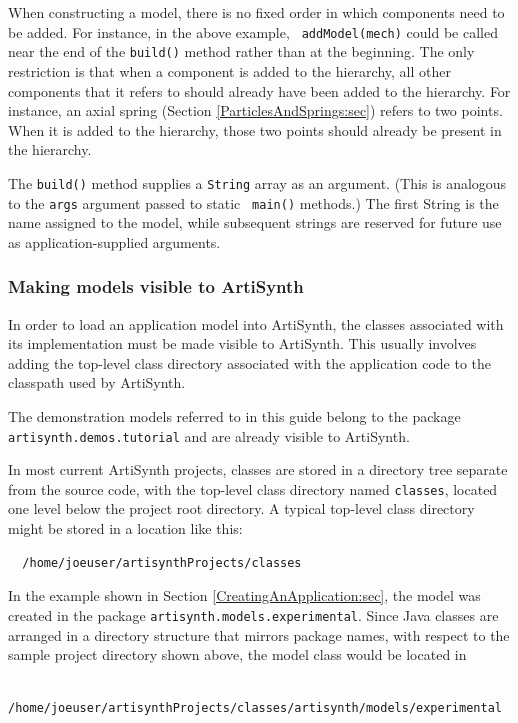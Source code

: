 When constructing a model, there is no fixed order in which components
need to be added. For instance, in the above example, {\tt
addModel(mech)} could be called near the end of the {\tt build()}
method rather than at the beginning. The only restriction is that when
a component is added to the hierarchy, all other components that it
refers to should already have been added to the hierarchy. For
instance, an axial spring (Section \ref{ParticlesAndSprings:sec})
refers to two points. When it is added to the hierarchy, those two
points should already be present in the hierarchy.

The {\tt build()} method supplies a {\tt String} array as an argument.
(This is analogous to the {\tt args} argument passed to static {\tt
main()} methods.) The first String is the name assigned to the model,
while subsequent strings are reserved for future use as
application-supplied arguments.

\subsubsection{Making models visible to ArtiSynth}

In order to load an application model into ArtiSynth, the classes
associated with its implementation must be made visible to ArtiSynth.
This usually involves adding the top-level class directory associated
with the application code to the classpath used by ArtiSynth.

\begin{sideblock}
The demonstration models referred to in this guide belong to the
package {\tt artisynth.demos.tutorial} and are already visible to
ArtiSynth.
\end{sideblock}

In most current ArtiSynth projects, classes are stored in
a directory tree separate from the source code, with the top-level
class directory named {\tt classes}, located one level below
the project root directory. A typical top-level class directory
might be stored in a location like this:
\begin{verbatim}
  /home/joeuser/artisynthProjects/classes
\end{verbatim}
In the example shown in Section \ref{CreatingAnApplication:sec}, the
model was created in the package {\tt artisynth.models.experimental}.
Since Java classes are arranged in a directory structure that mirrors
package names, with respect to the sample project directory shown
above, the model class would be located in
\begin{verbatim}
  /home/joeuser/artisynthProjects/classes/artisynth/models/experimental
\end{verbatim}

